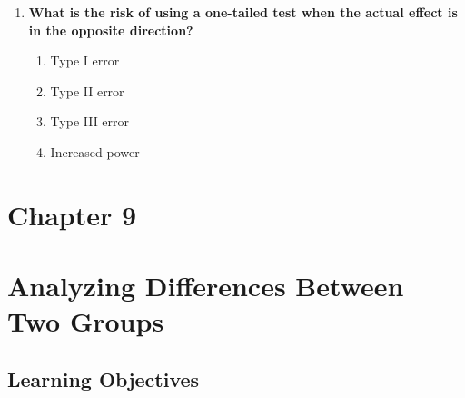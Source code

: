 \documentclass[
  letterpaper,
  DIV=11,
  numbers=noendperiod]{scrreprt}
\providecommand{\tightlist}{%
  \setlength{\itemsep}{0pt}\setlength{\parskip}{0pt}}
\begin{document}
\begin{enumerate}
  \begin{enumerate}
  \def\labelenumii{\alph{enumii}.}
  \tightlist
  \item
    To determine statistical significance\\
  \item
    To quantify the magnitude of a difference\\
  \item
    To check if assumptions are met\\
  \item
    To calculate degrees of freedom
  \end{enumerate}
\item
  \textbf{What is the risk of using a one-tailed test when the actual
  effect is in the opposite direction?}

  \begin{enumerate}
  \def\labelenumii{\alph{enumii}.}
  \tightlist
  \item
    Type I error\\
  \item
    Type II error\\
  \item
    Type III error\\
  \item
    Increased power
  \end{enumerate}
\end{enumerate}


\chapter{Chapter 9}\label{chapter-9}


\chapter*{Analyzing Differences Between Two
Groups\,}\label{analyzing-differences-between-two-groups}


\section*{Learning Objectives}\label{learning-objectives-8}
\end{document}

